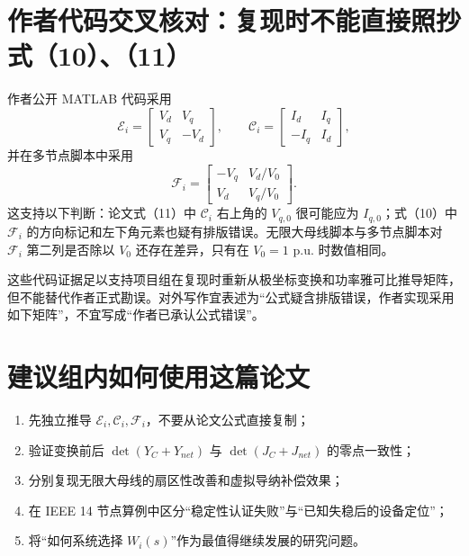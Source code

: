 \documentclass[11pt,a4paper]{ctexart}
\begin{document}
\section{作者代码交叉核对：复现时不能直接照抄式（10）、（11）}

作者公开 MATLAB 代码采用
\begin{equation}
\mathcal E_i=\begin{bmatrix}V_d&V_q\\V_q&-V_d\end{bmatrix},\qquad
\mathcal C_i=\begin{bmatrix}I_d&I_q\\-I_q&I_d\end{bmatrix},
\end{equation}
并在多节点脚本中采用
\begin{equation}
\mathcal F_i=
\begin{bmatrix}
-V_q&V_d/V_0\\
V_d&V_q/V_0
\end{bmatrix}.
\end{equation}
这支持以下判断：论文式（11）中 $\mathcal C_i$ 右上角的 $V_{q,0}$ 很可能应为 $I_{q,0}$；式（10）中 $\mathcal F_i$ 的方向标记和左下角元素也疑有排版错误。无限大母线脚本与多节点脚本对 $\mathcal F_i$ 第二列是否除以 $V_0$ 还存在差异，只有在 $V_0=1$ p.u. 时数值相同。

\begin{cautionbox}
这些代码证据足以支持项目组在复现时重新从极坐标变换和功率雅可比推导矩阵，但不能替代作者正式勘误。对外写作宜表述为“公式疑含排版错误，作者实现采用如下矩阵”，不宜写成“作者已承认公式错误”。
\end{cautionbox}

\section*{建议组内如何使用这篇论文}

\begin{enumerate}
  \item 先独立推导 $\mathcal E_i,\mathcal C_i,\mathcal F_i$，不要从论文公式直接复制；
  \item 验证变换前后 $\det(Y_C+Y_{net})$ 与 $\det(J_C+J_{net})$ 的零点一致性；
  \item 分别复现无限大母线的扇区性改善和虚拟导纳补偿效果；
  \item 在 IEEE 14 节点算例中区分“稳定性认证失败”与“已知失稳后的设备定位”；
  \item 将“如何系统选择 $W_i(s)$”作为最值得继续发展的研究问题。
\end{enumerate}
\end{document}
